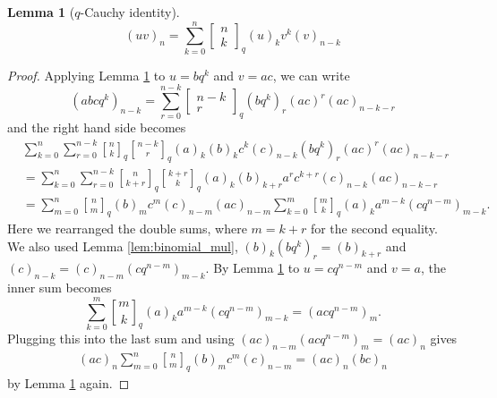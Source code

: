 \documentclass[10pt,a4paper]{amsart}
\newtheorem{lemma}{Lemma}
\newcommand{\qbin}[2]{\genfrac{[}{]}{0pt}{}{#1}{#2}_{q}}
\begin{document}
\begin{lemma}[$q$-Cauchy identity]
    \label{lem:binomial_cauchy}
    \begin{equation}
        (uv)_n = \sum_{k=0}^{n} \begin{bmatrix}
            n \\ k
        \end{bmatrix}_q (u)_k v^k (v)_{n-k}
    \end{equation}
\end{lemma}

\begin{proof}
    Applying Lemma \ref{lem:binomial_cauchy} to $u = bq^k$ and $v = ac$, we can write
    \begin{equation}
        \label{eqn:qPS-lemma}
        (abcq^k)_{n-k} = \sum_{r=0}^{n-k} \begin{bmatrix}
            n-k \\ r
        \end{bmatrix}_q (bq^k)_r (ac)^r (ac)_{n-k-r}
    \end{equation}
    and the right hand side becomes
    \begin{align*}
        &\sum_{k=0}^{n} \sum_{r=0}^{n-k} \qbin{n}{k} \qbin{n-k}{r} (a)_k (b)_k c^k (c)_{n-k} (bq^k)_r (ac)^r (ac)_{n-k-r}\\
        &=\sum_{k=0}^{n} \sum_{r=0}^{n-k} \qbin{n}{k+r}\qbin{k+r}{k} (a)_k (b)_{k+r} a^r c^{k+r} (c)_{n-k} (ac)_{n-k-r} \\
        &= \sum_{m=0}^{n} \qbin{n}{m} (b)_m c^m (c)_{n-m} (ac)_{n-m} \sum_{k=0}^{m} \qbin{m}{k} (a)_k a^{m-k} (cq^{n-m})_{m-k}.
    \end{align*}
    Here we rearranged the double sums, where $m = k + r$ for the second equality.
    We also used Lemma \eqref{lem:binomial_mul}, $(b)_k (bq^k)_r = (b)_{k+r}$ and $(c)_{n-k} = (c)_{n-m} (cq^{n-m})_{m-k}$.
    By Lemma \ref{lem:binomial_cauchy} to $u = cq^{n-m}$ and $v = a$, the inner sum becomes
    $$
        \sum_{k=0}^{m} \qbin{m}{k} (a)_k a^{m-k} (cq^{n-m})_{m-k} = (acq^{n-m})_m.
    $$
    Plugging this into the last sum and using $(ac)_{n-m}(acq^{n-m})_m = (ac)_n$ gives
    \begin{align*}
        (ac)_n \sum_{m=0}^{n} \qbin{n}{m} (b)_m c^m (c)_{n-m} = (ac)_n (bc)_n
    \end{align*}
    by Lemma \ref{lem:binomial_cauchy} again.
\end{proof}
\end{document}
